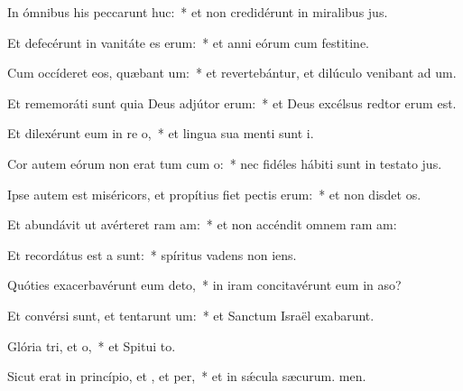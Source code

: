 \item In ómnibus his peccarunt huc:~* et non credidérunt in miralibus jus.
\item Et defecérunt in vanitáte es erum:~* et anni eórum cum festitine.
\item Cum occíderet eos, quæbant um:~* et revertebántur, et dilúculo venibant ad um.
\item Et rememoráti sunt quia Deus adjútor  erum:~* et Deus excélsus redtor erum est.
\item Et dilexérunt eum in re o,~* et lingua sua menti sunt i.
\item Cor autem eórum non erat tum cum o:~* nec fidéles hábiti sunt in testato jus.
\item Ipse autem est miséricors, et propítius fiet pectis erum:~* et non disdet os.
\item Et abundávit ut avérteret ram am:~* et non accéndit omnem ram am:
\item Et recordátus est a  sunt:~* spíritus vadens  non iens.
\item Quóties exacerbavérunt eum  deto,~* in iram concitavérunt eum in aso?
\item Et convérsi sunt, et tentarunt um:~* et Sanctum Israël exabarunt.
\item Glória tri, et o,~* et Spitui to.
\item Sicut erat in princípio, et , et per,~* et in sǽcula sæcurum. men.
